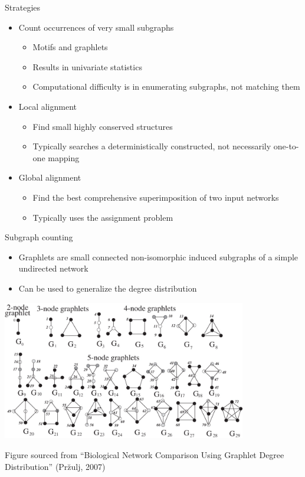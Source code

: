 \documentclass[xcolor=dvipsnames, 14pt]{beamer}
\begin{document}
\begin{frame}{Strategies}
\begin{itemize}
\item Count occurrences of very small subgraphs
\begin{itemize}
\item Motifs and graphlets
\item Results in univariate statistics
\item Computational difficulty is in enumerating subgraphs, not matching them
\pause
\end{itemize}
\item Local alignment
\begin{itemize}
\item Find small highly conserved structures
\item Typically searches a deterministically constructed, not necessarily one-to-one mapping
\end{itemize}
\pause
\item Global alignment
\begin{itemize}
\item Find the best comprehensive superimposition of two input networks
\item Typically uses the assignment problem
\end{itemize}
\end{itemize}
\end{frame}

\begin{frame}{Subgraph counting}
\begin{itemize}
\item Graphlets are small connected non-isomorphic induced subgraphs of a simple undirected network
\item Can be used to generalize the degree distribution
\end{itemize}
\centering
\includegraphics[width=0.8\textwidth]{graphlets_figure.png}

\tiny Figure sourced from ``Biological Network Comparison Using Graphlet Degree Distribution'' (Pr\u{z}ulj, 2007)
\end{frame}
\end{document}
